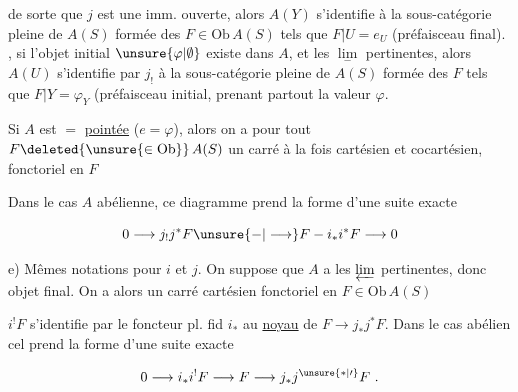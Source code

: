 de sorte que $j$ est une imm. ouverte, alors $A(Y)$ s'identifie  à la sous-catégorie pleine de $A(S)$ formée des $F\in\mathrm{Ob}\,A(S)$ tels que $F|U=e_{U}$ (préfaisceau final). , si l'objet initial $\unsure{\varphi|\emptyset}$ existe dans $A$, et les $\underset{-}{\lim}$ pertinentes, alors $A(U)$ s'identifie par $j_{!}$ à la sous-catégorie pleine de $A(S)$ formée des $F$ tels que $F|Y=\varphi_{Y}$ (préfaisceau initial,  prenant partout la valeur $\varphi$.

Si  $A$ est $=$ \uline{pointée} ($e=\varphi$), alors on a pour tout $F\deleted{\unsure{\in\mathrm{Ob}}}\,A(S)$ un carré à la fois cartésien et cocartésien, fonctoriel en $F$


Dans le cas $A$ abélienne, ce diagramme prend la forme d'une suite exacte

\[
0\longrightarrow j_{!}j^{*}F\unsure{-|\longrightarrow}F-i_{*}i^{*}F\longrightarrow0
\]

e) Mêmes notations pour $i$ et $j$. On suppose que $A$ a les $\varprojlim$ pertinentes, donc objet final. On a alors un carré cartésien fonctoriel en $F\in\mathrm{Ob}\,A(S)$


 $i^{!}F$ s'identifie par le foncteur pl. fid $i_{*}$ au \uline{noyau} de $F\longrightarrow j_{*}j^{*}F$. Dans le cas abélien cel prend la forme d'une suite exacte

\[
0\longrightarrow i_{*}i^{!}F\longrightarrow F\longrightarrow j_{*}j^{\unsure{*|\prime}}F\ .
\]

